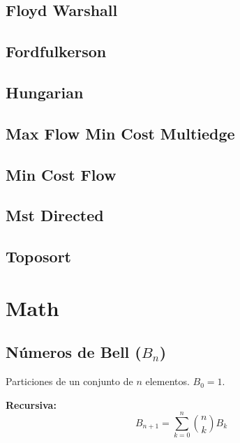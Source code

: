 \documentclass[9pt,portrait,twocolumn,a4paper,notitlepage]{article}
\newcommand\cppfile[2][]{%
\ifstrempty{#1}{}{}%
}
\begin{document}
\subsection{Floyd Warshall}
\cppfile{grafos_clean/floyd_warshall.cpp}

\subsection{Fordfulkerson}
\cppfile{grafos_clean/FordFulkerson.cpp}

\subsection{Hungarian}
\cppfile{grafos_clean/hungarian.cpp}

\subsection{Max Flow Min Cost Multiedge}
\cppfile{grafos_clean/max_flow_min_cost_multiedge.cpp}

\subsection{Min Cost Flow}
\cppfile{grafos_clean/min_cost_flow.cpp}

\subsection{Mst Directed}
\cppfile{grafos_clean/MST_Directed.cpp}

\subsection{Toposort}
\cppfile{grafos_clean/toposort.cpp}


\section{Math}


\subsection*{Números de Bell ($B_n$)}
Particiones de un conjunto de $n$ elementos. $B_0=1$.

\textbf{Recursiva:}
$$ B_{n+1} = \sum_{k=0}^{n} \binom{n}{k} B_k $$
\end{document}
